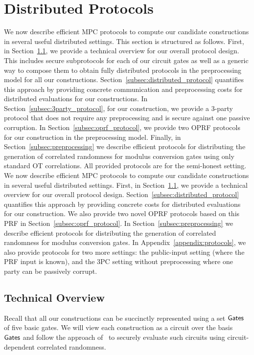 \section{Distributed Protocols}
\label{sec:distributed_protocols}
\iffull
We now describe efficient MPC protocols to compute our candidate constructions in several useful distributed settings. This section is structured as follows. First, in Section~\ref{subsec:protocol_overview}, we provide a technical overview for our overall protocol design. This includes secure subprotocols for each of our circuit gates as well as a generic way to compose them to obtain fully distributed protocols in the preprocessing model for all our constructions. Section~\ref{subsec:distributed_protocol} quantifies this approach by providing concrete communication and preprocessing costs for distributed evaluations for our constructions. In Section~\ref{subsec:3party_protocol}, for our \ttwPRF construction, we provide a 3-party protocol that does not require any preprocessing and is secure against one passive corruption. In Section~\ref{subsec:oprf_protocol}, we provide two OPRF protocols for our \ttwPRF construction in the preprocessing model.  Finally, in Section~\ref{subsec:preprocessing} we describe efficient protocols for distributing the generation of  correlated randomness for modulus conversion gates using only standard OT correlations.  All provided protocols are for the semi-honest setting.
\else
We now describe efficient MPC protocols to compute our candidate constructions in several useful distributed settings. First, in Section~\ref{subsec:protocol_overview}, we provide a technical overview for our overall protocol design. Section~\ref{subsec:distributed_protocol} quantifies this approach by providing concrete costs for distributed evaluations for our \ttwPRF construction. We also provide two novel OPRF protocols based on this PRF in Section~\ref{subsec:oprf_protocol}. In Section~\ref{subsec:preprocessing} we describe efficient protocols for distributing the generation of  correlated randomness for modulus conversion gates.
In Appendix~\ref{appendix:protocols}, we also provide protocols for two more settings: the public-input setting (where the PRF input is known), and the 3PC setting without preprocessing where one party can be passively corrupt.
\fi


\subsection{Technical Overview}
\label{subsec:protocol_overview}
Recall that all our constructions can be succinctly represented using a set $\textnormal{\textsf{Gates}}$ of five basic 
gates. We will view each construction as a circuit over the basis $\textnormal{\textsf{Gates}}$ and follow the approach of~\cite{damgard2017-tinytable,boyle2019-fss-preprocess} to securely evaluate such circuits using circuit-dependent correlated randomness. 

